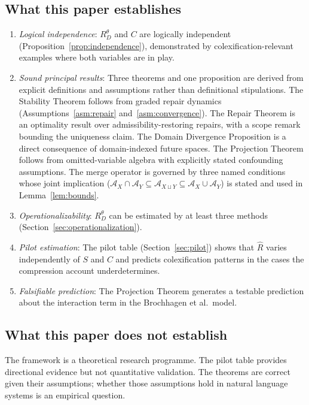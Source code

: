 \documentclass[12pt]{article}
\theoremstyle{rthm}
\theoremstyle{rdef}
\theoremstyle{remark}
\newcommand{\A}{\mathcal{A}}
\newcommand{\RD}[1][\theta]{R_{D}^{#1}}
\begin{document}
\subsection{What this paper establishes}

\begin{enumerate}
  \item \emph{Logical independence}: $\RD$ and $C$ are logically independent
        (Proposition~\ref{prop:independence}), demonstrated by colexification-relevant
        examples where both variables are in play.
  \item \emph{Sound principal results}: Three theorems and one proposition are
        derived from explicit definitions and assumptions rather than definitional
        stipulations. The Stability Theorem follows from graded repair dynamics
        (Assumptions~\ref{asm:repair} and~\ref{asm:convergence}). The Repair
        Theorem is an optimality result over admissibility-restoring repairs,
        with a scope remark bounding the uniqueness claim. The Domain Divergence
        Proposition is a direct consequence of domain-indexed future spaces. The
        Projection Theorem follows from omitted-variable algebra with explicitly
        stated confounding assumptions. The merge operator is governed by three
        named conditions whose joint implication ($\A_X \cap \A_Y \subseteq
        \A_{X \sqcup Y} \subseteq \A_X \cup \A_Y$) is stated and used in
        Lemma~\ref{lem:bounds}.
  \item \emph{Operationalizability}: $\RD$ can be estimated by at least three
        methods (Section~\ref{sec:operationalization}).
  \item \emph{Pilot estimation}: The pilot table (Section~\ref{sec:pilot}) shows
        that $\widehat{R}$ varies independently of $S$ and $C$ and predicts
        colexification patterns in the cases the compression account
        underdetermines.
  \item \emph{Falsifiable prediction}: The Projection Theorem generates a
        testable prediction about the interaction term in the Brochhagen et al.\
        model.
\end{enumerate}

\subsection{What this paper does not establish}

The framework is a theoretical research programme. The pilot table provides
directional evidence but not quantitative validation. The theorems are correct
given their assumptions; whether those assumptions hold in natural language
systems is an empirical question.
\end{document}
